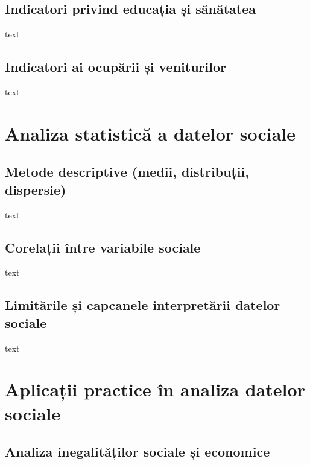 \documentclass[
  11pt,
  b5paper,
  nottoc]{book}
\begin{document}
\subsection{Indicatori privind educația și
sănătatea}\label{indicatori-privind-educaux21bia-ux219i-sux103nux103tatea}

text

\subsection{Indicatori ai ocupării și
veniturilor}\label{indicatori-ai-ocupux103rii-ux219i-veniturilor}

text

\section{Analiza statistică a datelor
sociale}\label{analiza-statisticux103-a-datelor-sociale}

\subsection{Metode descriptive (medii, distribuții,
dispersie)}\label{metode-descriptive-medii-distribuux21bii-dispersie}

text

\subsection{Corelații între variabile
sociale}\label{corelaux21bii-uxeentre-variabile-sociale}

text

\subsection{Limitările și capcanele interpretării datelor
sociale}\label{limitux103rile-ux219i-capcanele-interpretux103rii-datelor-sociale}

text

\section{Aplicații practice în analiza datelor
sociale}\label{aplicaux21bii-practice-uxeen-analiza-datelor-sociale}

\subsection{Analiza inegalităților sociale și
economice}\label{analiza-inegalitux103ux21bilor-sociale-ux219i-economice}
\end{document}
